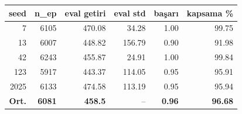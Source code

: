 \begin{tabular}{@{}rrrrrr@{}}
\toprule
seed & n\_ep & eval getiri & eval std & başarı & kapsama \% \\
\midrule
7 & 6105 & 470.08 & 34.28 & 1.00 & 99.75 \\
13 & 6007 & 448.82 & 156.79 & 0.90 & 91.98 \\
42 & 6243 & 455.87 & 24.91 & 1.00 & 99.84 \\
123 & 5917 & 443.37 & 114.05 & 0.95 & 95.91 \\
2025 & 6133 & 474.58 & 113.19 & 0.95 & 95.94 \\
\midrule
\textbf{Ort.} & \textbf{6081} & \textbf{458.5} & -- & \textbf{0.96} & \textbf{96.68} \\
\bottomrule
\end{tabular}
